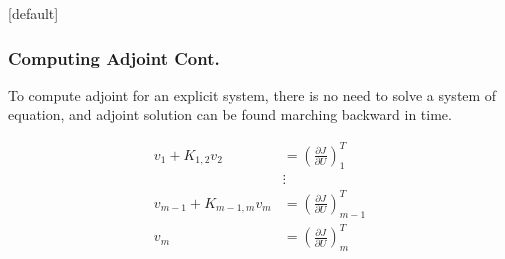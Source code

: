 \documentclass{beamer}
\makeatletter
\newenvironment{withoutheadline}{
        \setbeamertemplate{headline}[default]
        \def\beamer@entrycode{\vspace*{-\headheight}}
    }{}
\makeatother
\begin{document}
\begin{withoutheadline}
\begin{frame}\frametitle{Computing Adjoint Cont.} 
\begin{tcolorbox}[colback=blue!5,colframe=blue!75!black,title= Important conclusion:]
To compute adjoint for an explicit system, there is no need to solve a system of equation, and adjoint solution can be found marching backward in time.
\end{tcolorbox}

  \begin{displaymath}
  \begin{aligned}
 v_1 + K_{1,2} v_2 &=\left(\frac{\partial J}{\partial U}\right)_1^T \\
 &\vdots\\
 v_{m-1} + K_{m-1,m} v_m &=\left(\frac{\partial J}{\partial U}\right)_{m-1}^T \\
v_m &=\left(\frac{\partial J}{\partial U}\right)_m^T
 \end{aligned}
\end{displaymath}

\end{frame}
\end{withoutheadline}
\end{document}

